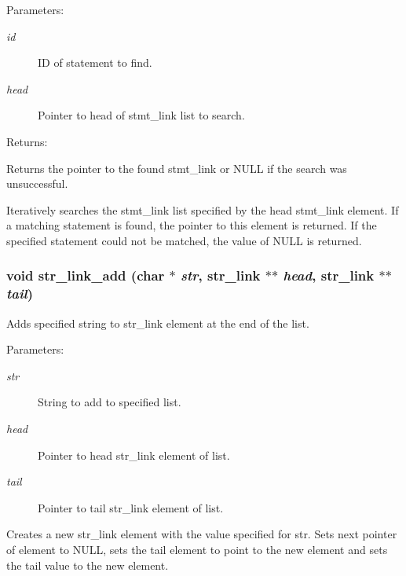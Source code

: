 \begin{Desc}
\item[Parameters: ]\par
\begin{description}
\item[{\em 
id}]ID of statement to find. \item[{\em 
head}]Pointer to head of stmt\_\-link list to search.\end{description}
\end{Desc}
\begin{Desc}
\item[Returns: ]\par
Returns the pointer to the found stmt\_\-link or NULL if the search was unsuccessful.\end{Desc}
Iteratively searches the stmt\_\-link list specified by the head stmt\_\-link element. If a matching statement is found, the pointer to this element is returned. If the specified statement could not be matched, the value of NULL is returned. 
\subsubsection{\setlength{\rightskip}{0pt plus 5cm}void str\_\-link\_\-add (char $\ast$ {\em str}, {\bf str\_\-link} $\ast$$\ast$ {\em head}, {\bf str\_\-link} $\ast$$\ast$ {\em tail})}\label{link_8h_a0}


Adds specified string to str\_\-link element at the end of the list.

\begin{Desc}
\item[Parameters: ]\par
\begin{description}
\item[{\em 
str}]String to add to specified list. \item[{\em 
head}]Pointer to head str\_\-link element of list. \item[{\em 
tail}]Pointer to tail str\_\-link element of list.\end{description}
\end{Desc}
Creates a new str\_\-link element with the value specified for str. Sets next pointer of element to NULL, sets the tail element to point to the new element and sets the tail value to the new element. 
